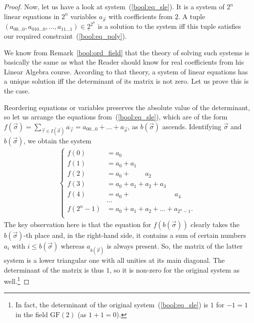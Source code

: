 \documentclass[12pt,notitlepage]{article}
\theoremstyle{plain}
\theoremstyle{definition}
\theoremstyle{plain}
\newcommand{\ul}[1]{\underline{#1}}
\newcommand{\1}{\mathbf{1}}
\newcommand{\0}{\mathbf{0}}
\begin{document}
\begin{proof}
	Now, let us have a look at system~(\ref{bool:eq_sle}). It is a system of $2^n$ linear equations in $2^n$ variables $a_{\vec \sigma}$ with coefficients from $\ul{2}$. A tuple $(a_{00\ldots0}, a_{010\ldots0}, \ldots, a_{11\ldots1}) \in \ul{2}^{2^n}$ is a solution to the system iff this tuple satisfies our required constraint~(\ref{bool:eq_poly}).
	
	We know from Remark~\ref{bool:ord_field} that the theory of solving such systems is basically the same as what the Reader should know for real coefficients from his Linear Algebra course. According to that theory, a system of linear equations has a unique solution iff the determinant of its matrix is not zero. Let us prove this is the case.
	
	Reordering equations or variables preserves the absolute value of the determinant, so let us arrange the equations from~(\ref{bool:eq_sle}), which are of the form $f(\vec \sigma) = \sum_{\vec\tau \in I(\vec \sigma)} a_{\vec\tau} = a_{00\ldots0} + \ldots + a_{\vec \sigma}$, as $b(\vec \sigma)$ ascends. Identifying $\vec \sigma$ and $b(\vec \sigma)$, we obtain the system
	$$
	\begin{array}{l}
		\begin{cases}
			f(0) &= a_0\\
			f(1) &= a_0 + a_1\\
			f(2) &= a_0 +\phantom{a_1 +} a_2\\
			f(3) &= a_0 + a_1 + a_2 + a_3\\
			f(4) &= a_0 +\phantom{a_1 + a_2 + a_3 +} a_4\\
			&\ldots\\
			f(2^{n} - 1) &= a_0 + a_1 + a_2 + \ldots + a_{2^{n} - 1}.\\
		\end{cases}
	\end{array}
	$$
	The key observation here is that the equation for $f(b(\vec \sigma))$ clearly takes the $b(\vec \sigma)$-th place and, in the right-hand side, it contains a sum of certain numbers $a_i$ with $i \leq b(\vec \sigma)$ whereas $a_{b(\vec \sigma)}$ is always present. So, the matrix of the latter system is a lower triangular one with all unities at its main diagonal. The determinant of the matrix is thus $1$, so it is non-zero for the original system as well.\footnote{In fact, the determinant of the original system~(\ref{bool:eq_sle}) is $1$ for $-1 = 1$ in the field $\mathrm{GF}(2)$ (as $1 + 1 = 0$).}
\end{proof}
\end{document}
